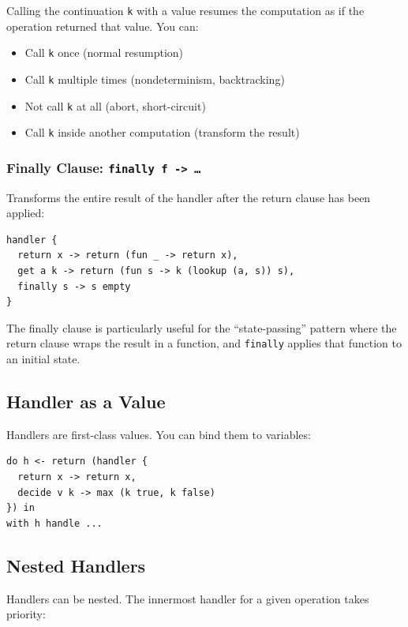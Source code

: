 \documentclass[11pt,a4paper]{article}
\newcommand{\cba}[1]{\lstinline[style=cbainline]{#1}}
\begin{document}
Calling the continuation \texttt{k} with a value resumes the computation as if
the operation returned that value.  You can:

\begin{itemize}
  \item Call \texttt{k} once (normal resumption)
  \item Call \texttt{k} multiple times (nondeterminism, backtracking)
  \item Not call \texttt{k} at all (abort, short-circuit)
  \item Call \texttt{k} inside another computation (transform the result)
\end{itemize}

\subsubsection{Finally Clause: \texttt{finally f -> \ldots}}

Transforms the entire result of the handler after the return clause has been
applied:

\begin{lstlisting}
handler {
  return x -> return (fun _ -> return x),
  get a k -> return (fun s -> k (lookup (a, s)) s),
  finally s -> s empty
}
\end{lstlisting}

The finally clause is particularly useful for the ``state-passing'' pattern
where the return clause wraps the result in a function, and \cba{finally}
applies that function to an initial state.

\subsection{Handler as a Value}

Handlers are first-class values.  You can bind them to variables:

\begin{lstlisting}
do h <- return (handler {
  return x -> return x,
  decide v k -> max (k true, k false)
}) in
with h handle ...
\end{lstlisting}

\subsection{Nested Handlers}

Handlers can be nested.  The innermost handler for a given operation takes
priority:
\end{document}
